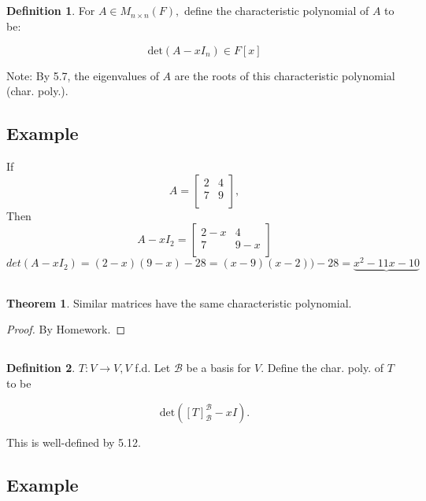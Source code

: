 \documentclass[a4paper,10pt]{article}
\theoremstyle{definition}
\newtheorem{theorem}{Theorem}[section]
\newtheorem{definition}{Definition}[section]
\begin{document}
\subsection{}
\begin{definition}
	For $A \in M_{n \times n} (F),$ define the characteristic polynomial of $A$
	to be: 

	$$\text{det}(A - xI_n) \in F[x]$$

	Note: By 5.7, the eigenvalues of $A$ are the roots of this characteristic
	polynomial (char. poly.).
\end{definition}

\subsection{Example}

If $$A=
\begin{bmatrix}
	2 & 4 \\
	7 & 9 \\
\end{bmatrix}
,$$
Then
$$A-xI_2 = 
\begin{bmatrix}
	2-x & 4 \\
	7 & 9-x \\
\end{bmatrix}
$$
$$det(A-xI_2) = (2-x)(9-x) -28 = (x-9)(x-2)) -28 = \underbrace{x^2 -11x -10}$$

\subsection{}
\begin{theorem}
	Similar matrices have the same characteristic polynomial.
\end{theorem}
\begin{proof}
	By Homework.
\end{proof}

\subsection{}
\begin{definition}
	$T : V \to V, V$ f.d. Let $\mathcal{B}$ be a basis for $V$. Define the char.
	poly. of $T$ to be 

	$$\text{det}([T]_\mathcal{B}^\mathcal{B} - x I).$$

	This is well-defined by 5.12.
\end{definition}

\subsection{Example}
\end{document}
